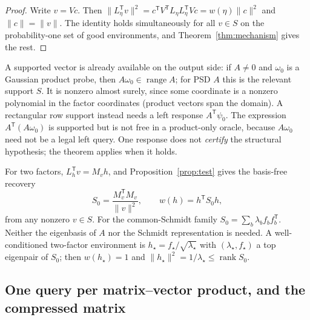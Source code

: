 \documentclass[11pt,a4paper]{article}
\theoremstyle{definition}
\theoremstyle{remark}
\numberwithin{equation}{section}
\newcommand{\T}{{\mathsf T}}
\newcommand{\rank}{\operatorname{rank}}
\newcommand{\range}{\operatorname{range}}
\newcommand{\norm}[1]{\lVert#1\rVert}
\begin{document}
\begin{proof}
Write $v=Vc$. Then $\norm{L_\eta^\T v}^2=c^\T V^\T L_\eta L_\eta^\T Vc=w(\eta)\norm c^2$
and $\norm c=\norm v$. The identity holds simultaneously for all $v\in S$ on the
probability-one set of good environments, and Theorem~\ref{thm:mechanism}
gives the rest.
\end{proof}

A supported vector is already available on the output side: if $A\ne0$ and
$\omega_0$ is a Gaussian product probe, then $A\omega_0\in\range A$; for PSD
$A$ this is the relevant support $S$. It is nonzero almost surely,
since some coordinate is a nonzero polynomial in the factor coordinates
(product vectors span the domain). A rectangular row support instead needs
a left response $A^\T\psi_0$. The expression $A^\T(A\omega_0)$ is supported
but is not free in a product-only oracle, because $A\omega_0$ need not be a
legal left query. One response does not \emph{certify} the
structural hypothesis; the theorem applies when it holds.

For two factors, $L_h^\T v=M_vh$, and Proposition~\ref{prop:test} gives the
basis-free recovery
\begin{equation}\label{eq:Srecover}
 S_0=\frac{M_v^\T M_v}{\norm v^2},\qquad w(h)=h^\T S_0h,
\end{equation}
from any nonzero $v\in S$. For the common-Schmidt family
$S_0=\sum_b\lambda_bf_bf_b^\T$. Neither the eigenbasis of $A$ nor the Schmidt
representation is needed. A well-conditioned two-factor environment is
$h_\star=f_\star/\sqrt{\lambda_\star}$ with $(\lambda_\star,f_\star)$ a top
eigenpair of $S_0$; then $w(h_\star)=1$ and $\norm{h_\star}^2=1/\lambda_\star\le\rank S_0$.
\subsection{One query per matrix--vector product, and the compressed matrix}
\end{document}

